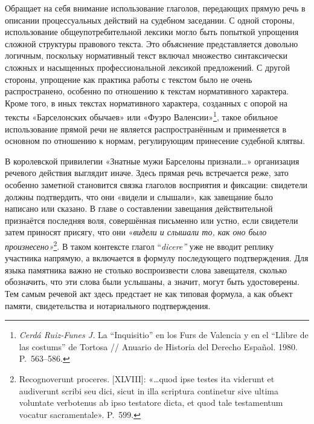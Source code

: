 Обращает на себя внимание использование глаголов, передающих прямую речь в описании процессуальных действий на судебном заседании. С одной стороны, использование общеупотребительной лексики могло быть попыткой упрощения сложной структуры правового текста. Это объяснение представляется довольно логичным, поскольку нормативный текст включал множество синтаксически сложных и насыщенных профессиональной лексикой предложений. С другой стороны, упрощение как практика работы с текстом было не очень распространено, особенно по отношению к текстам нормативного характера. Кроме того, в иных текстах нормативного характера, созданных с опорой на тексты «Барселонских обычаев» или «Фуэро Валенсии»\footnote{\emph{Cerdá Ruiz-Funes J.} La “Inquisitio” en los Furs de Valencia y en el “Llibre de las costums” de Tortosa // Anuario de Historia del Derecho Español. 1980. P.~563--586.}, такое обильное использование прямой речи не является распространённым и применяется в основном по отношению к нормам, регулирующим принесение судебной клятвы.

В королевской привилегии «Знатные мужи Барселоны признали…» организация речевого действия выглядит иначе. Здесь прямая речь встречается реже, зато особенно заметной становится связка глаголов восприятия и фиксации: свидетели должны подтвердить, что они «видели и слышали», как завещание было написано или сказано. В главе о составлении завещания\emph{ }действительной признаётся последняя воля, совершённая письменно или устно, если свидетели затем приносят присягу, что они «\emph{видели и слышали то, как оно было произнесено»}\footnote{Recognoverunt proceres. [XLVIII]: «…quod ipse testes ita viderunt et audiverunt scribi seu dici, sicut in illa scriptura continetur sive ultima voluntate verbotenus ab ipso testatore dicta, et quod tale testamentum vocatur sacramentale». P.~599.}. В таком контексте глагол “\emph{dicere”} уже не вводит реплику участника напрямую, а включается в формулу последующего подтверждения. Для языка памятника важно не столько воспроизвести слова завещателя, сколько обозначить, что эти слова были услышаны, а значит, могут быть удостоверены. Тем самым речевой акт здесь предстает не как типовая формула, а как объект памяти, свидетельства и нотариального подтверждения.

